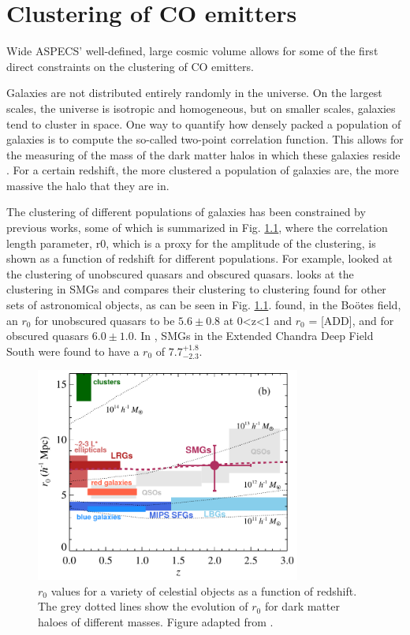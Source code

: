 \chapter{Clustering of CO emitters}

Wide ASPECS' well-defined, large cosmic volume allows for some of the first direct constraints on the clustering of CO emitters.

Galaxies are not distributed entirely randomly in the universe. On the largest scales, the universe is isotropic and homogeneous, but on smaller scales, galaxies tend to cluster in space. One way to quantify how densely packed a population of galaxies is to compute the so-called two-point correlation function. This allows for the measuring of the mass of the dark matter halos in which these galaxies reside \cite{hickox2011clustering}. For a certain redshift, the more clustered a population of galaxies are, the more massive the halo that they are in.

The clustering of different populations of galaxies has been constrained by previous works, some of which is summarized in Fig. \ref{fig:Hickox_compare}, where the correlation length parameter, r0, which is a proxy for the amplitude of the clustering, is shown as a function of redshift for different populations. For example, \cite{hickox2011clustering} looked at the clustering of unobscured quasars and obscured quasars. \cite{10.1111/j.1365-2966.2011.20303.x} looks at the clustering in SMGs and compares their clustering to clustering found for other sets of astronomical objects, as can be seen in Fig. \ref{fig:Hickox_compare}. \cite{hickox2011clustering} found, in the Bo\"otes field, an $r_0$ for unobscured quasars to be $5.6 \pm 0.8$ at 0<z<1 and $r_0$ = [ADD], and for obscured quasars $6.0 \pm 1.0 $. In \cite{10.1111/j.1365-2966.2011.20303.x}, SMGs in the Extended Chandra Deep Field South were found to have a $r_0$ of $7.7_{-2.3}^{+1.8}$.

\begin{figure}[!htb]
\centering \includegraphics[width=87mm]{clustering/Hickox2012_Compare.png}
\caption{$r_0$ values for a variety of celestial objects as a function of redshift. The grey dotted lines show the evolution of $r_0$ for dark matter haloes of different masses. Figure adapted from \cite{10.1111/j.1365-2966.2011.20303.x}.}
\label{fig:Hickox_compare}
\end{figure}

